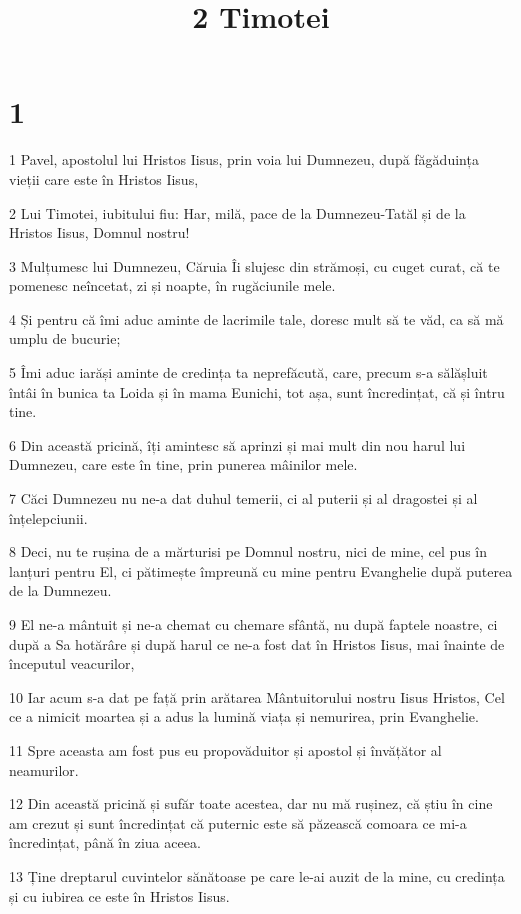 

\title{2 Timotei}


\chapter{1}

\par 1 Pavel, apostolul lui Hristos Iisus, prin voia lui Dumnezeu, după făgăduința vieții care este în Hristos Iisus,
\par 2 Lui Timotei, iubitului fiu: Har, milă, pace de la Dumnezeu-Tatăl și de la Hristos Iisus, Domnul nostru!
\par 3 Mulțumesc lui Dumnezeu, Căruia Îi slujesc din strămoși, cu cuget curat, că te pomenesc neîncetat, zi și noapte, în rugăciunile mele.
\par 4 Și pentru că îmi aduc aminte de lacrimile tale, doresc mult să te văd, ca să mă umplu de bucurie;
\par 5 Îmi aduc iarăși aminte de credința ta neprefăcută, care, precum s-a sălășluit întâi în bunica ta Loida și în mama Eunichi, tot așa, sunt încredințat, că și întru tine.
\par 6 Din această pricină, îți amintesc să aprinzi și mai mult din nou harul lui Dumnezeu, care este în tine, prin punerea mâinilor mele.
\par 7 Căci Dumnezeu nu ne-a dat duhul temerii, ci al puterii și al dragostei și al înțelepciunii.
\par 8 Deci, nu te rușina de a mărturisi pe Domnul nostru, nici de mine, cel pus în lanțuri pentru El, ci pătimește împreună cu mine pentru Evanghelie după puterea de la Dumnezeu.
\par 9 El ne-a mântuit și ne-a chemat cu chemare sfântă, nu după faptele noastre, ci după a Sa hotărâre și după harul ce ne-a fost dat în Hristos Iisus, mai înainte de începutul veacurilor,
\par 10 Iar acum s-a dat pe față prin arătarea Mântuitorului nostru Iisus Hristos, Cel ce a nimicit moartea și a adus la lumină viața și nemurirea, prin Evanghelie.
\par 11 Spre aceasta am fost pus eu propovăduitor și apostol și învățător al neamurilor.
\par 12 Din această pricină și sufăr toate acestea, dar nu mă rușinez, că știu în cine am crezut și sunt încredințat că puternic este să păzească comoara ce mi-a încredințat, până în ziua aceea.
\par 13 Ține dreptarul cuvintelor sănătoase pe care le-ai auzit de la mine, cu credința și cu iubirea ce este în Hristos Iisus.
